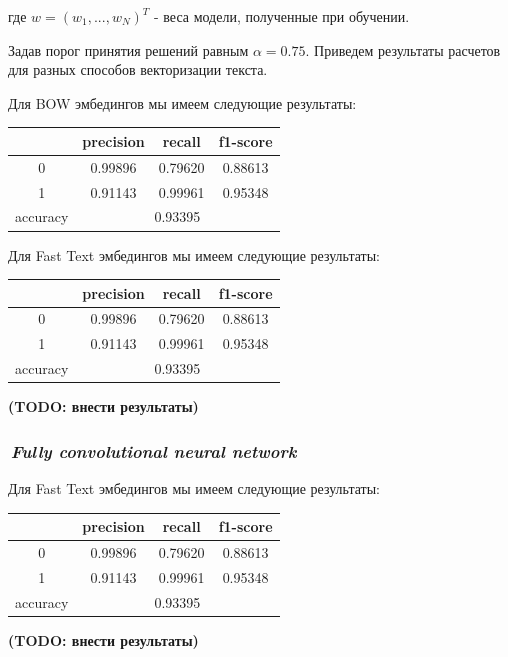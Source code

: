 \documentclass[12pt]{article}
\begin{document}
где $w=(w_1, ..., w_N)^T$ - веса модели, полученные при обучении.


Задав порог принятия решений равным $\alpha = 0.75$. Приведем результаты расчетов для разных способов векторизации текста.

Для BOW эмбедингов мы имеем следующие результаты:
\begin{center}
  \begin{tabular}{ | c | c | c | c |}
    \hline
      & precision & recall & f1-score \\ \hline
    0 & 0.99896 & 0.79620 & 0.88613 \\ \hline
    1 & 0.91143 & 0.99961 & 0.95348 \\ \hline
    accuracy & \multicolumn{3}{c|}{0.93395} \\                   
    \hline
  \end{tabular}
\end{center}


Для Fast Text эмбедингов мы имеем следующие результаты:
\begin{center}
  \begin{tabular}{ | c | c | c | c |}
    \hline
      & precision & recall & f1-score \\ \hline
    0 & 0.99896 & 0.79620 & 0.88613 \\ \hline
    1 & 0.91143 & 0.99961 & 0.95348 \\ \hline
    accuracy & \multicolumn{3}{c|}{0.93395} \\                   
    \hline
  \end{tabular}
\end{center}
{\bf\color{amaranth} (TODO: внести результаты)}

\subsubsection*{\it\,Fully convolutional neural network}
Для Fast Text эмбедингов мы имеем следующие результаты:
\begin{center}
  \begin{tabular}{ | c | c | c | c |}
    \hline
      & precision & recall & f1-score \\ \hline
    0 & 0.99896 & 0.79620 & 0.88613 \\ \hline
    1 & 0.91143 & 0.99961 & 0.95348 \\ \hline
    accuracy & \multicolumn{3}{c|}{0.93395} \\                   
    \hline
  \end{tabular}
\end{center}
{\bf\color{amaranth} (TODO: внести результаты)}
\end{document}
